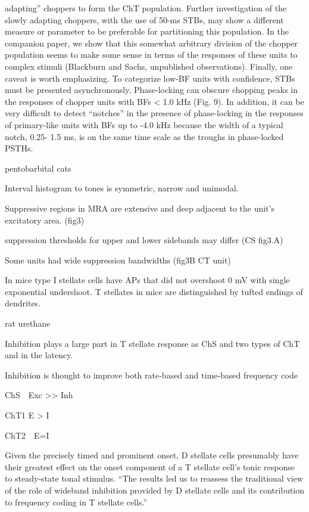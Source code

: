 \documentclass[10pt,a4paper]{article}
\begin{document}
adapting{\textquotedblright} choppers to form the ChT population.  Further
investigation of the slowly adapting choppers, with the use of 50-ms STBs, may
show a different measure or parameter to be preferable for partitioning this
population. In the companion paper, we show that this somewhat arbitrary
division of the chopper population seems to make some sense in terms of the
responses of these units to complex stimuli (Blackburn and Sachs, unpublished
observations). Finally, one caveat is worth emphasizing. To categorize low-BF
units with confidence, STBs must be presented asynchronously. Phase-locking can
obscure chopping peaks in the responses of chopper units with BFs {\textless}
1.0 kHz (Fig. 9). In addition, it can be very difficult to detect
{\textquotedblleft}notches{\textquotedblright} in the presence of phase-locking
in the responses of primary-like units with BFs up to -4.0 kHz because the width
of a typical notch, 0.25- 1.5 ms, is on the same time scale as the troughs in
phase-locked PSTHs.


\citep{RhodeGreenberg:1994a} pentobarbital cats

Interval histogram to tones is symmetric, narrow and unimodal.

Suppressive regions in MRA are extensive and deep adjacent to the
unit{\textquoteright}s excitatory area. (fig3)

suppression thresholds for upper and lower sidebands may differ (CS fig3.A)

Some units had wide suppression bandwidths (fig3B CT unit)

In mice \citep{OertelWuEtAl:1990} type I stellate cells have APs that did not
overshoot 0 mV with single exponential undershoot.  T stellates in mice are
distinguished by tufted endings of dendrites.



\citep{PaoliniClareyEtAl:2005,PaoliniClareyEtAl:2004} rat urethane

Inhibition plays a large part in T stellate response as ChS and two types of ChT
and in the latency.

Inhibition is thought to improve both rate-based and time-based frequency code

ChS\ \ Exc {\textgreater}{\textgreater} Inh

ChT1 E {\textgreater} I\ \

ChT2\ \ E=I

Given the precisely timed and prominent onset, D stellate cells presumably have
their greatest effect on the onset component of a T stellate
cell{\textquoteright}s tonic response to steady-state tonal stimulus.
{\textquotedblleft}The results led us to reassess the traditional view of the
role of wideband inhibition provided by D stellate cells and its contribution to
frequency coding in T stellate cells.{\textquotedblright}
\end{document}
